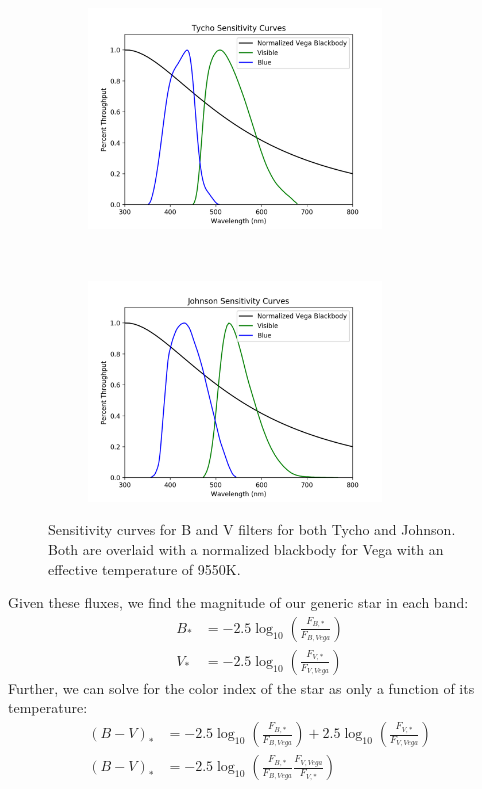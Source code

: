 \documentclass[]{DINOReportMemo}
\begin{document}
\begin{figure}[t!]
    \centering
    \begin{subfigure}
        \centering
        \includegraphics[height=2.3in]{tycho_curves}
    \end{subfigure}%
    ~ 
    \begin{subfigure}
        \centering
        \includegraphics[height=2.3in]{johnson_curves}
    \end{subfigure}
    \caption{Sensitivity curves for B and V filters for both Tycho and Johnson. Both are overlaid with a normalized blackbody for Vega with an effective temperature of 9550K.}
\end{figure}


Given these fluxes, we find the magnitude of our generic star in each band:
\begin{equation}
\begin{split}
    B_* &= -2.5\log_{10}\left(\frac{F_{B,*}}{F_{B,Vega}}\right) \\
    V_* &= -2.5\log_{10}\left(\frac{F_{V,*}}{F_{V,Vega}}\right)
\end{split}
\end{equation}
Further, we can solve for the color index of the star as only a function of its temperature:
\begin{equation}
\begin{split}
    (B-V)_* &= -2.5\log_{10}\left(\frac{F_{B,*}}{F_{B,Vega}}\right) +2.5\log_{10}\left(\frac{F_{V,*}}{F_{V,Vega}}\right) \\
    (B-V)_* &= -2.5\log_{10}\left(\frac{F_{B,*}}{F_{B,Vega}}\frac{F_{V,Vega}}{F_{V,*}}\right)
\end{split}
\end{equation}
\end{document}
